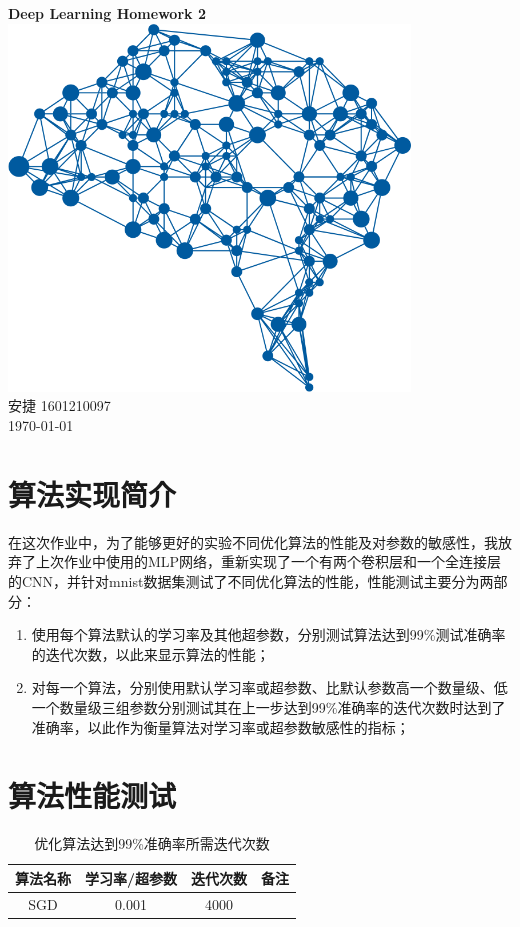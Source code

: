 \documentclass[a4paper, UTF8]{ctexrep}
\begin{document}
	\begin{titlepage}
		\centering
		\vspace{6cm}
		\LARGE{\textbf{Deep Learning Homework 2}}\\
		\vspace{4cm}
		\includegraphics[width=0.8\textwidth]{deepLearning.png}\\
		\vspace{4cm}
		\normalsize{安捷 1601210097}\\
		\normalsize{\today}
	\end{titlepage}
		\section{算法实现简介}
			在这次作业中，为了能够更好的实验不同优化算法的性能及对参数的敏感性，我放弃了上次作业中使用的MLP网络，重新实现了一个有两个卷积层和一个全连接层的CNN，并针对mnist数据集测试了不同优化算法的性能，性能测试主要分为两部分：
			\begin{enumerate}
				\item 使用每个算法默认的学习率及其他超参数，分别测试算法达到99\%测试准确率的迭代次数，以此来显示算法的性能；
				\item 对每一个算法，分别使用默认学习率或超参数、比默认参数高一个数量级、低一个数量级三组参数分别测试其在上一步达到99\%准确率的迭代次数时达到了准确率，以此作为衡量算法对学习率或超参数敏感性的指标；
			\end{enumerate}
		\section{算法性能测试}
			\begin{table}[htbp!]
				\centering
				\begin{tabular}{cccc}
					\hline
					算法名称 & 学习率/超参数 & 迭代次数 & 备注 \\
					\hline
					SGD & 0.001 & 4000 &   \\

				\end{tabular}
				\caption{优化算法达到99\%准确率所需迭代次数}
			\end{table}
\end{document}
